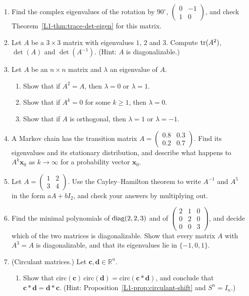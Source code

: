 \begin{enumerate}[leftmargin=*]
	\item Find the complex eigenvalues of the rotation by $90^\circ$, $\begin{pmatrix} 0 & -1 \\ 1 & 0 \end{pmatrix}$, and check Theorem~\ref{L1-thm:trace-det-eigen} for this matrix.
	\item Let $A$ be a $3 \times 3$ matrix with eigenvalues $1$, $2$ and $3$. Compute $\operatorname{tr}(A^2)$, $\det(A)$ and $\det(A^{-1})$. (Hint: $A$ is diagonalizable.)
	\item Let $A$ be an $n \times n$ matrix and $\lambda$ an eigenvalue of $A$.
	\begin{enumerate}
		\item Show that if $A^2 = A$, then $\lambda = 0$ or $\lambda = 1$.
		\item Show that if $A^k = 0$ for some $k \geq 1$, then $\lambda = 0$.
		\item Show that if $A$ is orthogonal, then $\lambda = 1$ or $\lambda = -1$.
	\end{enumerate}
	\item \homework{} A Markov chain has the transition matrix $A = \begin{pmatrix} 0.8 & 0.3 \\ 0.2 & 0.7 \end{pmatrix}$. Find its eigenvalues and its stationary distribution, and describe what happens to $A^k \mathbf{x}_0$ as $k \to \infty$ for a probability vector $\mathbf{x}_0$.
	\item \homework{} Let $A = \begin{pmatrix} 1 & 2 \\ 3 & 4 \end{pmatrix}$. Use the Cayley--Hamilton theorem to write $A^{-1}$ and $A^5$ in the form $aA + bI_2$, and check your answers by multiplying out.
	\item Find the minimal polynomials of $\operatorname{diag}(2, 2, 3)$ and of $\begin{pmatrix} 2 & 1 & 0 \\ 0 & 2 & 0 \\ 0 & 0 & 3 \end{pmatrix}$, and decide which of the two matrices is diagonalizable. Show that every matrix $A$ with $A^3 = A$ is diagonalizable, and that its eigenvalues lie in $\{-1, 0, 1\}$.
	\item (Circulant matrices.) Let $\mathbf{c}, \mathbf{d} \in \mathbb{R}^n$.
	\begin{enumerate}
		\item Show that $\mathrm{circ}(\mathbf{c})\,\mathrm{circ}(\mathbf{d}) = \mathrm{circ}(\mathbf{c} \ast \mathbf{d})$, and conclude that $\mathbf{c} \ast \mathbf{d} = \mathbf{d} \ast \mathbf{c}$. (Hint: Proposition~\ref{L1-prop:circulant-shift} and $S^n = I_n$.)

\end{enumerate}
\end{enumerate}
